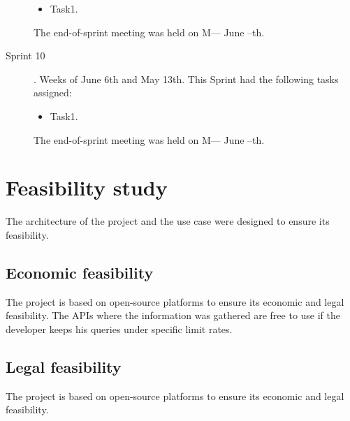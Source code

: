\begin{description}
	\begin{itemize}
		\item Task1.
	\end{itemize}
	The end-of-sprint meeting was held on M--- June --th.
	\item[Sprint 10]. Weeks of June 6th and May 13th. This Sprint had the following tasks assigned:
	\begin{itemize}
		\item Task1.
	\end{itemize}
	The end-of-sprint meeting was held on M--- June --th.
\end{description}

\section{Feasibility study}
\nonzeroparskip The architecture of the project and the use case were designed to ensure its feasibility.

\subsection{Economic feasibility}
\nonzeroparskip The project is based on open-source platforms to ensure its economic and legal feasibility. The APIs where the information was gathered are free to use if the developer keeps his queries under specific limit rates.

\subsection{Legal feasibility}
\nonzeroparskip The project is based on open-source platforms to ensure its economic and legal feasibility. 

